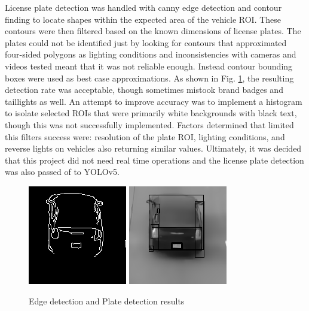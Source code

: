 \documentclass[12pt]{article}
\begin{document}
License plate detection was handled with canny edge detection and contour finding to locate shapes within the expected area of the vehicle ROI. These contours were then filtered based on the known dimensions of license plates. The plates could not be identified just by looking for contours that approximated four-sided polygons as lighting conditions and inconsistencies with cameras and videos tested meant that it was not reliable enough. Instead contour bounding boxes were used as best case approximations. As shown in Fig. \ref{fig:tradPlateDet}, the resulting detection rate was acceptable, though sometimes mistook brand badges and taillights as well. An attempt to improve accuracy was to implement a histogram to isolate selected ROIs that were primarily white backgrounds with black text, though this was not successfully implemented. Factors determined that limited this filters success were: resolution of the plate ROI, lighting conditions, and reverse lights on vehicles also returning similar values. Ultimately, it was decided that this project did not need real time operations and the license plate detection was also passed of to YOLOv5. \\

\begin{figure}
    \centering
    \includegraphics{Edges_screenshot_19.05.2023.png}
    \includegraphics{Car ROI_screenshot_19.05.2023.png}
    \caption{Edge detection and Plate detection results}
    \label{fig:tradPlateDet}
\end{figure}
\end{document}
